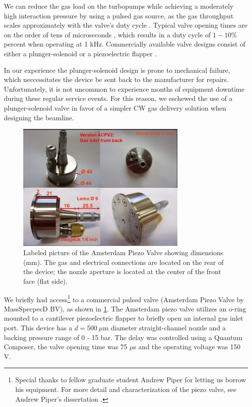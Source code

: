 We can reduce the gas load on the turbopumps while achieving a moderately high interaction pressure by using a pulsed gas source, as the gas throughput scales approximately with the valve's duty cycle \cite{christenStationaryFlowConditions2013}. Typical valve opening times are on the order of tens of microseconds \cite{irimiaSituCharacterizationCold2009,mengMeasurementDensityProfile2015,irimiaShortPulseMicrosecond2009}, which results in a duty cycle of $1 - 10 \%$ percent when operating at 1 kHz. Commercially available valve designs consist of either a plunger-solenoid \cite{evenEvenLavieValveSource2015} or a piezoelectric flapper \cite{irimiaSituCharacterizationCold2009,mengMeasurementDensityProfile2015,irimiaShortPulseMicrosecond2009}.

In our experience the plunger-solenoid design is prone to mechanical failure, which neccessitates the device be sent back to the manufacturer for repairs. Unfortunately, it is not uncommon to experience months of equipment downtime during these regular service events. For this reason, we eschewed the use of a plunger-solenoid valve in favor of a simpler CW gas delivery solution when designing the beamline.

\begin{figure}
	\centering
	\includegraphics[width=0.75\textwidth]{figures/chap3/piezovalve_picture.png}
	\caption{Labeled picture of the Amsterdam Piezo Valve showing dimensions (mm). The gas and electrical connections are located on the rear of the device; the nozzle aperture is located at the center of the front face (flat side).}
	\label{fig:piezovalve_picture}
\end{figure}

We briefly had access\footnote{Special thanks to fellow graduate student Andrew Piper for letting us borrow his equipment. For more detail and characterization of the piezo valve, see Andrew Piper's dissertation \cite{piperAndrewPiperDissertation2022}.} to a commercial pulsed valve (Amsterdam Piezo Valve by MassSpecpecD BV), as shown in \cref{fig:piezovalve_picture}. The Amsterdam piezo valve utilizes an o-ring mounted to a cantilever piezoelectric flapper to briefly open an internal gas inlet port. This device has a $d = 500 \ \mu \textrm{m}$ diameter straight-channel nozzle and a backing pressure range of 0 - 15 bar. The delay was controlled using a Quantum Composer, the valve opening time was 75 $\mu$s and the operating voltage was 150 V.


